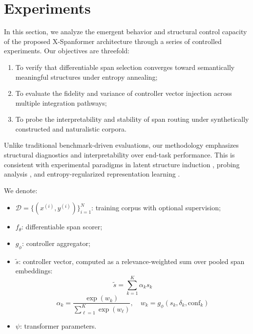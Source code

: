 \section{Experiments}
\label{sec:experiments}

In this section, we analyze the emergent behavior and structural control capacity of the proposed X-Spanformer architecture through a series of controlled experiments. Our objectives are threefold:
\begin{enumerate}[leftmargin=2em]
    \item To verify that differentiable span selection converges toward semantically meaningful structures under entropy annealing;
    \item To evaluate the fidelity and variance of controller vector injection across multiple integration pathways;
    \item To probe the interpretability and stability of span routing under synthetically constructed and naturalistic corpora.
\end{enumerate}

Unlike traditional benchmark-driven evaluations, our methodology emphasizes structural diagnostics and interpretability over end-task performance. This is consistent with experimental paradigms in latent structure induction \cite{kim2019unsupervised, naradowsky2021structured, ma2023hierarchical}, probing analysis \cite{belinkov2022probing, hewitt2019structural}, and entropy-regularized representation learning \cite{pereyra2017regularizing, grandvalet2005semi}.

\vspace{0.5em}
\noindent We denote:
\begin{itemize}[leftmargin=1.6em]
  \item \(\mathcal{D} = \{(x^{(i)}, y^{(i)})\}_{i=1}^{N}\): training corpus with optional supervision;
  \item \(f_\theta\): differentiable span scorer;
  \item \(g_\phi\): controller aggregator;
  \item \(\tilde{s}\): controller vector, computed as a relevance-weighted sum over pooled span embeddings:
  \begin{equation}
  \tilde{s} = \sum_{k=1}^{K} \alpha_k s_k
  \end{equation}
  \begin{equation}
  \alpha_k = \frac{\exp(w_k)}{\sum_{\ell=1}^{K} \exp(w_\ell)}, \quad
  w_k = g_\phi(s_k, \delta_k, \mathrm{conf}_k)
  \end{equation}
  \item \(\psi\): transformer parameters.
\end{itemize}

